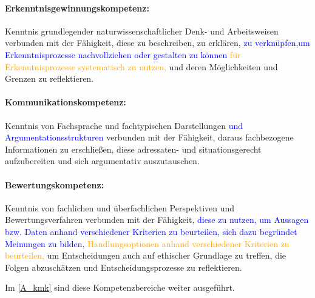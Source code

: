 \paragraph{Erkenntnisgewinnungskompetenz:} Kenntnis grundlegender
naturwissenschaftlicher Denk- und Arbeitsweisen verbunden mit der Fähigkeit, diese zu beschreiben, zu erklären, \textcolor{blue}{zu verknüpfen,um Erkenntnisprozesse nachvollziehen oder gestalten zu können} \textcolor{orange}{für Erkenntnisprozesse systematisch zu nutzen,} und deren Möglichkeiten und Grenzen zu reflektieren.

\paragraph{Kommunikationskompetenz:} Kenntnis von Fachsprache und
fachtypischen Darstellungen \textcolor{blue}{und Argumentationsstrukturen} verbunden mit der Fähigkeit, daraus fachbezogene Informationen
zu erschließen, diese adres\-saten- und situationsgerecht aufzubereiten und sich argumentativ
auszutauschen.

\paragraph{Bewertungskompetenz:} Kenntnis von fachlichen und überfachlichen Perspektiven und Bewertungsverfahren verbunden mit der Fähigkeit, \textcolor{blue}{diese zu nutzen, um Aussagen bzw. Daten anhand verschiedener Kriterien zu beurteilen, sich dazu begründet Meinungen zu bilden,} \textcolor{orange}{Handlungsoptionen anhand verschiedener Kriterien zu beurteilen,} um Entscheidungen auch auf ethischer Grundlage zu treffen, die Folgen abzuschätzen und Entscheidungsprozesse zu reflektieren.

Im \cref{A_kmk} sind diese Kompetenzbereiche weiter ausgeführt.

